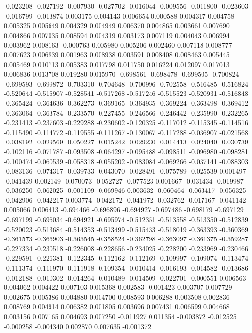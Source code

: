 -0.023208
-0.027192
-0.007930
-0.027702
-0.016044
-0.009556
-0.011800
-0.023603
-0.016799
-0.013874
0.003175
0.004143
0.006654
0.000588
0.004317
0.004758
0.005325
0.005649
0.004329
0.004949
0.006370
0.004865
0.003661
0.007690
0.004866
0.007035
0.008594
0.004319
0.003173
0.007119
0.004043
0.006994
0.003962
0.008163
-0.000763
0.005980
0.005206
0.002460
0.007118
0.008777
0.007623
0.006839
0.001963
0.008938
0.003591
0.008408
0.008463
0.005445
0.005469
0.010713
0.005383
0.017798
0.011750
0.016224
0.012097
0.017013
0.006836
0.013708
0.019280
0.015970
-0.698561
-0.698478
-0.699505
-0.700824
-0.699593
-0.699872
-0.703310
-0.704648
-0.700996
-0.702558
-0.516485
-0.516824
-0.520644
-0.515907
-0.528541
-0.517268
-0.517246
-0.515523
-0.520931
-0.516848
-0.365424
-0.364636
-0.362273
-0.369165
-0.364935
-0.369224
-0.363498
-0.369412
-0.363064
-0.363784
-0.233570
-0.227455
-0.246566
-0.246442
-0.235990
-0.232265
-0.231413
-0.237603
-0.229288
-0.230602
-0.120325
-0.117012
-0.115345
-0.114516
-0.115490
-0.114772
-0.119555
-0.111267
-0.130067
-0.117288
-0.036907
-0.021568
-0.038192
-0.029569
-0.050227
-0.015242
-0.029230
-0.014413
-0.024040
-0.030739
-0.102116
-0.071787
-0.093508
-0.064297
-0.095488
-0.098511
-0.096980
-0.098281
-0.100474
-0.060539
-0.058318
-0.055202
-0.083084
-0.069266
-0.037141
-0.088303
-0.083136
-0.074317
-0.039733
-0.043070
-0.028491
-0.075789
-0.025539
0.001497
-0.041439
0.002149
-0.070073
-0.052727
-0.077523
0.001667
-0.031434
-0.019987
-0.036250
-0.062025
-0.001109
-0.069946
0.003632
-0.060464
-0.063417
-0.056325
-0.042906
-0.042217
0.003774
-0.042172
-0.041972
-0.032762
-0.017167
-0.041142
0.005066
0.006413
-0.694466
-0.696896
-0.694927
-0.697486
-0.698179
-0.697129
-0.697199
-0.696034
-0.694921
-0.695974
-0.512351
-0.513558
-0.513350
-0.512839
-0.520023
-0.513684
-0.514353
-0.513499
-0.515433
-0.518019
-0.363393
-0.360369
-0.361573
-0.366903
-0.363545
-0.358524
-0.362798
-0.363097
-0.361375
-0.359287
-0.227334
-0.230518
-0.226008
-0.228656
-0.234025
-0.228200
-0.233969
-0.230466
-0.229591
-0.226381
-0.122345
-0.112162
-0.112169
-0.109997
-0.109074
-0.113474
-0.111374
-0.111970
-0.111918
-0.109354
-0.010414
-0.016193
-0.014582
-0.013686
-0.012188
-0.010302
-0.014264
-0.010489
-0.014509
-0.022701
-0.000551
0.006563
0.004062
0.004422
0.007103
0.005368
0.002583
-0.001423
0.003707
0.007729
0.002675
0.005386
0.004880
0.004700
0.008593
0.006288
0.003508
0.002836
0.008769
0.004914
0.006382
0.001805
0.003696
0.007431
0.006599
0.004668
0.003156
0.007165
0.004693
0.007250
-0.011927
0.011354
-0.003872
-0.012525
-0.000258
-0.004340
0.002870
0.007635
-0.001372
